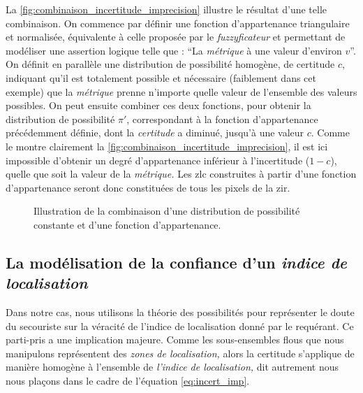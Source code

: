 La \autoref{fig:combinaison_incertitude_imprecision} illustre le
résultat d'une telle combinaison. On commence par définir une fonction
d'appartenance triangulaire et normalisée, équivalente à celle
proposée par le \emph{fuzzyficateur}  et
permettant de modéliser une assertion logique telle que : \enquote{La
  \emph{métrique} à une valeur d'environ \(v\)}. On définit en
parallèle une distribution de possibilité homogène, de certitude
\(c\), indiquant qu'il est totalement possible et nécessaire
(faiblement dans cet exemple) que la \emph{métrique} prenne n'importe
quelle valeur de l'ensemble des valeurs possibles. On peut ensuite
combiner ces deux fonctions, pour obtenir la distribution de
possibilité \(\pi'\), correspondant à la fonction d’appartenance
précédemment définie, dont la \emph{certitude} a diminué, jusqu'à une
valeur \(c\). Comme le montre clairement la
\autoref{fig:combinaison_incertitude_imprecision}, il est ici
impossible d'obtenir un degré d'appartenance inférieur à l'incertitude
(\(1-c\)), quelle que soit la valeur de la \emph{métrique.} Les
\ac{zlc} construites à partir d'une fonction d'appartenance seront
donc constituées de tous les pixels de la \ac{zir}.

\begin{figure}
  \centering
  
  \caption{Illustration de la combinaison d'une distribution de
    possibilité constante et d'une fonction d'appartenance.}
  \label{fig:combinaison_incertitude_imprecision}
\end{figure}

\subsection{La modélisation de la confiance d'un \emph{indice de
    localisation}}

Dans notre cas, nous utilisons la théorie des possibilités pour
représenter le doute du secouriste sur la véracité de l'indice de
localisation donné par le requérant. Ce parti-pris a une implication
majeure. Comme les sous-ensembles flous que nous manipulons
représentent des \emph{zones de localisation,} alors la certitude
s'applique de manière homogène à l'ensemble de \emph{l'indice de
  localisation,} dit autrement nous nous plaçons dans le cadre de
l'équation \ref{eq:incert_imp}.

